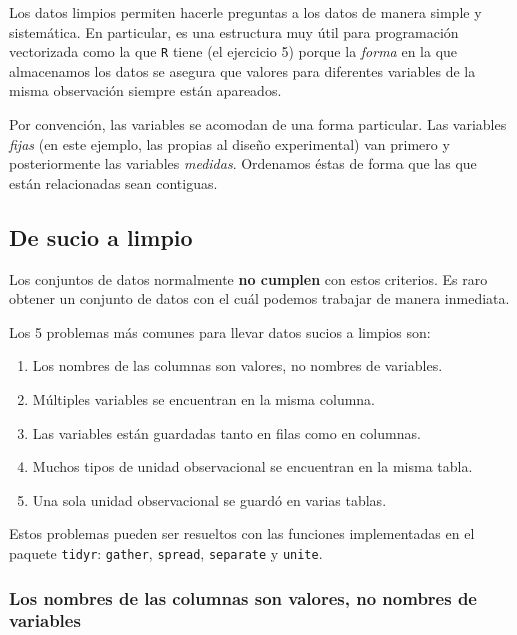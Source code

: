 \documentclass[]{article}
\providecommand{\tightlist}{%
  \setlength{\itemsep}{0pt}\setlength{\parskip}{0pt}}
\begin{document}
Los datos limpios permiten hacerle preguntas a los datos de manera
simple y sistemática. En particular, es una estructura muy útil para
programación vectorizada como la que \texttt{R} tiene (el ejercicio 5)
porque la \emph{forma} en la que almacenamos los datos se asegura que
valores para diferentes variables de la misma observación siempre están
apareados.

Por convención, las variables se acomodan de una forma particular. Las
variables \emph{fijas} (en este ejemplo, las propias al diseño
experimental) van primero y posteriormente las variables \emph{medidas}.
Ordenamos éstas de forma que las que están relacionadas sean contiguas.

\subsection{De sucio a limpio}\label{de-sucio-a-limpio}

Los conjuntos de datos normalmente \textbf{no cumplen} con estos
criterios. Es raro obtener un conjunto de datos con el cuál podemos
trabajar de manera inmediata.

Los 5 problemas más comunes para llevar datos sucios a limpios
\parencite[][p. 5]{wickham2014tidy} son:

\begin{enumerate}
\def\labelenumi{\arabic{enumi}.}
\tightlist
\item
  Los nombres de las columnas son valores, no nombres de variables.
\item
  Múltiples variables se encuentran en la misma columna.
\item
  Las variables están guardadas tanto en filas como en columnas.
\item
  Muchos tipos de unidad observacional se encuentran en la misma tabla.
\item
  Una sola unidad observacional se guardó en varias tablas.
\end{enumerate}

Estos problemas pueden ser resueltos con las funciones implementadas en
el paquete \texttt{tidyr}: \texttt{gather}, \texttt{spread},
\texttt{separate} y \texttt{unite}.

\subsubsection{Los nombres de las columnas son valores, no nombres de
variables}\label{los-nombres-de-las-columnas-son-valores-no-nombres-de-variables}
\end{document}
